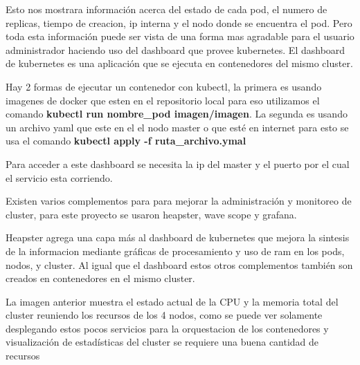       
      
      Esto nos mostrara información acerca del estado de cada pod, el numero de replicas, tiempo de creacion, ip interna y el nodo donde se encuentra el pod. Pero toda esta información puede ser vista de una forma mas agradable para el usuario administrador haciendo uso del dashboard que provee kubernetes. El dashboard de kubernetes es una aplicación que se ejecuta en contenedores del mismo cluster.
      
     Hay 2 formas de ejecutar un contenedor con kubectl, la primera es usando imagenes de docker que esten en el repositorio local para eso utilizamos el comando \textbf{kubectl run nombre\_pod imagen/imagen}. La segunda es usando un archivo yaml que este en el el nodo master o que esté en internet para esto se usa el comando \textbf{kubectl apply -f ruta\_archivo.ymal}
     
     
     
     Para acceder a este dashboard se necesita la ip del master y el puerto por el cual el servicio esta corriendo.
     
     
     Existen varios complementos para para mejorar la administración y monitoreo de cluster, para este proyecto se usaron heapster, wave scope y grafana.
     
     Heapster agrega una capa más al dashboard de kubernetes que mejora la sintesis de la informacion mediante gráficas de procesamiento y uso de ram en los pods, nodos, y cluster.
     Al igual que el dashboard estos otros complementos también son creados en contenedores en el mismo cluster.
     
     
     
      
      La imagen anterior muestra el estado actual de la CPU y la memoria total del cluster reuniendo los recursos de los 4 nodos, como se puede ver solamente desplegando estos pocos servicios para la orquestacion de los contenedores y visualización de estadísticas del cluster se requiere una buena cantidad de recursos
      
      
      

